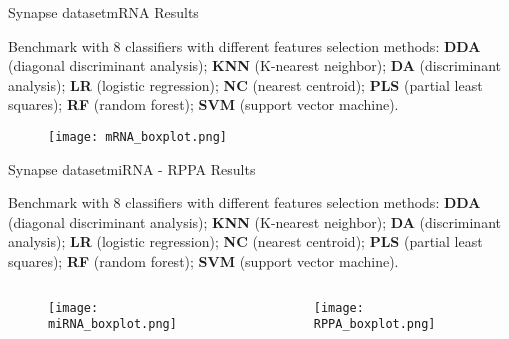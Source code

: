 \documentclass{standalone}
\begin{document}
\begin{frame}{Synapse dataset}{mRNA Results}

  \scriptsize{Benchmark with 8 classifiers with different features selection methods: \textbf{DDA} (diagonal discriminant analysis); \textbf{KNN} (K-nearest neighbor); \textbf{DA} (discriminant analysis); \textbf{LR} (logistic regression); \textbf{NC} (nearest centroid); \textbf{PLS} (partial least squares); \textbf{RF} (random forest); \textbf{SVM} (support vector machine).}

  \begin{figure}
    \begin{overprint}
      \centering\texttt{[image: mRNA\_boxplot.png]}
      \centering\def\svgwidth{0.7\linewidth}
    \end{overprint}
  \end{figure}

\end{frame}


\begin{frame}{Synapse dataset}{miRNA - RPPA Results}

  \scriptsize{Benchmark with 8 classifiers with different features selection methods: \textbf{DDA} (diagonal discriminant analysis); \textbf{KNN} (K-nearest neighbor); \textbf{DA} (discriminant analysis); \textbf{LR} (logistic regression); \textbf{NC} (nearest centroid); \textbf{PLS} (partial least squares); \textbf{RF} (random forest); \textbf{SVM} (support vector machine).}

  \begin{columns}

    \begin{column}{0.5\linewidth}

      \begin{figure}
        \begin{overprint}
          \centering\texttt{[image: miRNA\_boxplot.png]}
          \centering\def\svgwidth{\linewidth}
        \end{overprint}
      \end{figure}

    \end{column}

    \begin{column}{0.5\linewidth}

      \begin{figure}
        \begin{overprint}
          \centering\texttt{[image: RPPA\_boxplot.png]}
          \centering\def\svgwidth{\linewidth}
        \end{overprint}
      \end{figure}

    \end{column}

  \end{columns}

\end{frame}
\end{document}
